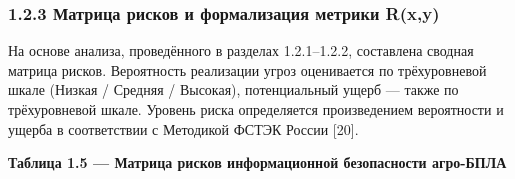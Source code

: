 \hypertarget{ux43cux430ux442ux440ux438ux446ux430-ux440ux438ux441ux43aux43eux432-ux438-ux444ux43eux440ux43cux430ux43bux438ux437ux430ux446ux438ux44f-ux43cux435ux442ux440ux438ux43aux438-rxy}{%
\subsubsection{1.2.3 Матрица рисков и формализация метрики R(x,y)}\label{ux43cux430ux442ux440ux438ux446ux430-ux440ux438ux441ux43aux43eux432-ux438-ux444ux43eux440ux43cux430ux43bux438ux437ux430ux446ux438ux44f-ux43cux435ux442ux440ux438ux43aux438-rxy}}

На основе анализа, проведённого в разделах 1.2.1--1.2.2, составлена сводная матрица рисков. Вероятность реализации угроз оценивается по трёхуровневой шкале (Низкая / Средняя / Высокая), потенциальный ущерб --- также по трёхуровневой шкале. Уровень риска определяется произведением вероятности и ущерба в соответствии с Методикой ФСТЭК России {[}20{]}.

\textbf{Таблица 1.5 --- Матрица рисков информационной безопасности агро-БПЛА}

